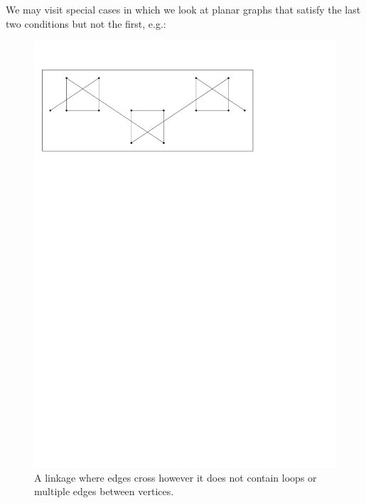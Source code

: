 We may visit special cases in which we look at planar graphs that satisfy the last two conditions 
but not the first, e.g.:
\begin{figure}[h]
\begin{center}
\includegraphics[scale=1]{graphics/crossingEdgeLinkage.pdf}
\end{center} 
\caption{A linkage where edges cross however it does not contain loops or multiple edges between 
vertices.}
\label{fig:linkage-3}
\end{figure}
